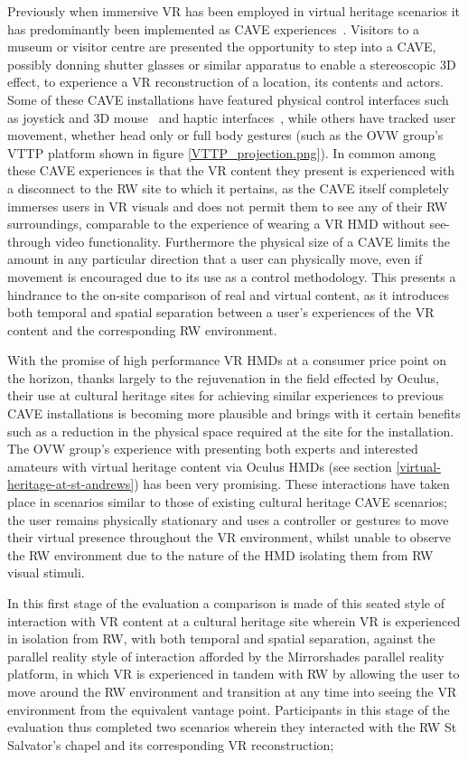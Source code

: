 Previously when immersive VR has been employed in virtual heritage scenarios it has predominantly been implemented as CAVE experiences~\cite{Roussou2002}. Visitors to a museum or visitor centre are presented the opportunity to step into a CAVE, possibly donning shutter glasses or similar apparatus to enable a stereoscopic 3D effect, to experience a VR reconstruction of a location, its contents and actors. Some of these CAVE installations have featured physical control interfaces such as joystick and 3D mouse~\cite{cabral:x3dexperience} and haptic interfaces~\cite{Christou2006}, while others have tracked user movement, whether head only or full body  gestures (such as the OVW group's VTTP platform shown in figure \ref{VTTP_projection.png}). In common among these CAVE experiences is that the VR content they present is experienced with a disconnect to the RW site to which it pertains, as the CAVE itself completely immerses users in VR visuals and does not permit them to see any of their RW surroundings, comparable to the experience of wearing a VR HMD without see-through video functionality. Furthermore the physical size of a CAVE limits the amount in any particular direction that a user can physically move, even if movement is encouraged due to its use as a control methodology. This presents a hindrance to the on-site comparison of real and virtual content, as it introduces both temporal and spatial separation between a user's experiences of the VR content and the corresponding RW environment.

With the promise of high performance VR HMDs at a consumer price point on the horizon, thanks largely to the rejuvenation in the field effected by Oculus, their use at cultural heritage sites for achieving similar experiences to previous CAVE installations is becoming more plausible and brings with it certain benefits such as a reduction in the physical space required at the site for the installation. The OVW group's experience with presenting both experts and interested amateurs with virtual heritage content via Oculus HMDs (see section \ref{virtual-heritage-at-st-andrews}) has been very promising. These interactions have taken place in scenarios similar to those of existing cultural heritage CAVE scenarios; the user remains physically stationary and uses a controller or gestures to move their virtual presence throughout the VR environment, whilst unable to observe the RW environment due to the nature of the HMD isolating them from RW visual stimuli.

In this first stage of the evaluation a comparison is made of this seated style of interaction with VR content at a cultural heritage site wherein VR is experienced in isolation from RW, with both temporal and spatial separation, against the parallel reality style of interaction afforded by the Mirrorshades parallel reality platform, in which VR is experienced in tandem with RW by allowing the user to move around the RW environment and transition at any time into seeing the VR environment from the equivalent vantage point. Participants in this stage of the evaluation thus completed two scenarios wherein they interacted with the RW St Salvator's chapel and its corresponding VR reconstruction;

